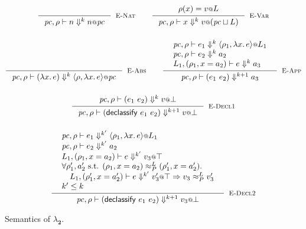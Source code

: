 \documentclass{article}
\makeatletter
\newcommand{\at}{\ensuremath{{\scriptstyle{@}}}}
\newcommand{\pc}{\ensuremath{{\mathit{pc}}}}
\theoremstyle{definition}
\makeatother
\begin{document}
\begin{figure}[ht]
  \centering
  \begin{gather*}
    \inference{}{
      \pc, \rho |- n \Downarrow^{k} n \at \pc
    }[\textsc{E-Nat}]
    \qquad
    \inference{
      {\begin{array}{l}
          \rho(x) = v \at L
        \end{array}}
    }{
      \pc, \rho |- x \Downarrow^{k} v \at (\pc \sqcup L)
    }[\textsc{E-Var}]
    \\[3ex]
    \inference{}{
      \pc, \rho |- (\lambda{x}.\, e) \Downarrow^{k}
      \langle{\rho, \lambda{x}.\, e\rangle} \at \pc
    }[\textsc{E-Abs}]
    \qquad
    \inference{
      {\begin{array}{l}
          \pc, \rho |- e_1 \Downarrow^{k}
          \langle{\rho_1, \lambda{x}.\, e\rangle} \at L_1
          \\
          \pc, \rho |- e_2 \Downarrow^{k} a_2
          \\
          L_1, (\rho_1, x = a_2) |- e \Downarrow^{k} a_3
        \end{array}}
    }{
      \pc, \rho |- (e_1\ e_2) \Downarrow^{k+1} a_3
    }[\textsc{E-App}]
    \\[3ex]
    \inference{
      {\begin{array}{l}
          \pc, \rho |- (e_1\ e_2) \Downarrow^{k} v \at \bot
        \end{array}}
    }{
      \pc, \rho |- (\mathsf{declassify}\ e_1\ e_2) \Downarrow^{k+1} v \at \bot
    }[\textsc{E-Decl1}]
    \\[3ex]
    \inference{
      {\begin{array}[b]{l}
          \pc, \rho |- e_1 \Downarrow^{k'}
          \langle{\rho_1, \lambda{x}.\, e\rangle} \at L_1
          \\
          \pc, \rho |- e_2 \Downarrow^{k'} a_2
          \\
          L_1, (\rho_1, x = a_2) |- e \Downarrow^{k'} v_3 \at \top
          \\
          \forall{\rho_1', a_2' \text{ s.t. }
            (\rho_1, x = a_2) \approx^{L}_{P} (\rho_1', x = a_2')}.\,
          \\\quad
          L_1, (\rho_1', x = a_2') |- e \Downarrow^{k'} v_3' \at \top =>
          v_3 \approx^{L}_{P} v_3'
          \\
          k' \leq k
        \end{array}}
    }{
      \pc, \rho |- (\mathsf{declassify}\ e_1\ e_2) \Downarrow^{k+1} v_3 \at \bot
    }[\textsc{E-Decl2}]
  \end{gather*}
  \caption{Semantics of $\lambda_{\mathbf{2}}$.}
  \label{fig:semantics}
\end{figure}
\end{document}
